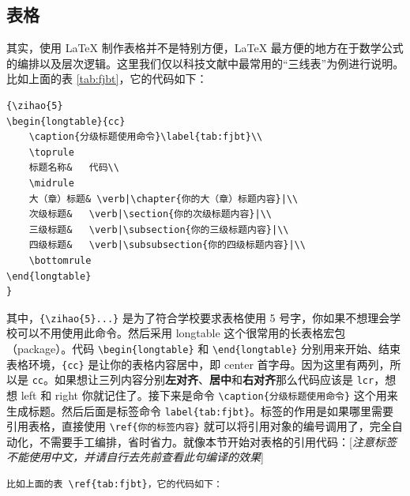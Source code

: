 \subsection{表格}\label{text:table}
其实，使用 LaTeX 制作表格并不是特别方便，LaTeX 最方便的地方在于数学公式的编排以及层次逻辑。这里我们仅以科技文献中最常用的“三线表”为例进行说明。比如上面的表 \ref{tab:fjbt}，它的代码如下：
\begin{Verbatim}[frame=single]
{\zihao{5}
\begin{longtable}{cc}
	\caption{分级标题使用命令}\label{tab:fjbt}\\
	\toprule
	标题名称&	代码\\
	\midrule
	大（章）标题&	\verb|\chapter{你的大（章）标题内容}|\\
	次级标题&	\verb|\section{你的次级标题内容}|\\
	三级标题&	\verb|\subsection{你的三级标题内容}|\\
	四级标题&	\verb|\subsubsection{你的四级标题内容}|\\
	\bottomrule
\end{longtable}
}
\end{Verbatim}
其中，\verb|{\zihao{5}...}| 是为了符合学校要求表格使用 5 号字，你如果不想理会学校可以不用使用此命令。然后采用 longtable 这个很常用的长表格宏包（package）。代码 \verb|\begin{longtable}| 和 \verb|\end{longtable}| 分别用来开始、结束表格环境，\verb|{cc}| 是让你的表格内容居中，即 center 首字母。因为这里有两列，所以是 \verb|cc|。如果想让三列内容分别{\bf 左对齐}、{\bf 居中}和{\bf 右对齐}那么代码应该是 \verb|lcr|，想想 left 和 right 你就记住了。接下来是命令 \verb|\caption{分级标题使用命令}| 这个用来生成标题。然后后面是标签命令 \verb|label{tab:fjbt}|。标签的作用是如果哪里需要引用表格，直接使用 \verb|\ref{你的标签内容}| 就可以将引用对象的编号调用了，完全自动化，不需要手工编排，省时省力。就像本节开始对表格的引用代码：[{\sl 注意标签不能使用中文，并请自行去先前查看此句编译的效果}]
\begin{Verbatim}[frame=single]
比如上面的表 \ref{tab:fjbt}，它的代码如下：
\end{Verbatim}

